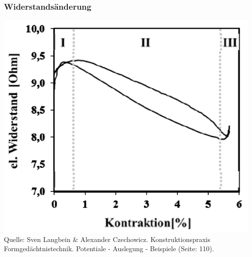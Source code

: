\begin{frame}[c]\frametitle{Widerstandsänderung}
	\centering
	\includegraphics[height=0.5\textwidth]{medien/widerstand_zu_kontraktion.png}
	\\
	\tiny{Quelle: Sven Langbein \& Alexander Czechowicz. Konstruktionspraxis
	Formgedächtnistechnik. Potentiale - Auslegung - Beispiele (Seite: 110).}
\end{frame}
